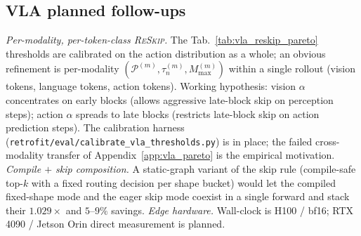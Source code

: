 \documentclass{article}
\newcommand{\reskip}{\textsc{ReSkip}}
\begin{document}
\subsection{VLA planned follow-ups}
\label{app:vla_future}
\emph{Per-modality, per-token-class \reskip{}.} The Tab.~\ref{tab:vla_reskip_pareto} thresholds are calibrated on the action distribution as a whole; an obvious refinement is per-modality $(\mathcal{P}^{(m)}, \tau_n^{(m)}, M_{\max}^{(m)})$ within a single rollout (vision tokens, language tokens, action tokens). Working hypothesis: vision $\alpha$ concentrates on early blocks (allows aggressive late-block skip on perception steps); action $\alpha$ spreads to late blocks (restricts late-block skip on action prediction steps). The calibration harness (\texttt{retrofit/eval/calibrate\_vla\_thresholds.py}) is in place; the failed cross-modality transfer of Appendix~\ref{app:vla_pareto} is the empirical motivation. \emph{Compile $+$ skip composition.} A static-graph variant of the skip rule (compile-safe top-$k$ with a fixed routing decision per shape bucket) would let the compiled fixed-shape mode and the eager skip mode coexist in a single forward and stack their $1.029\times$ and $5$--$9\%$ savings. \emph{Edge hardware.} Wall-clock is H100 / bf16; RTX 4090 / Jetson Orin direct measurement is planned.
\end{document}
